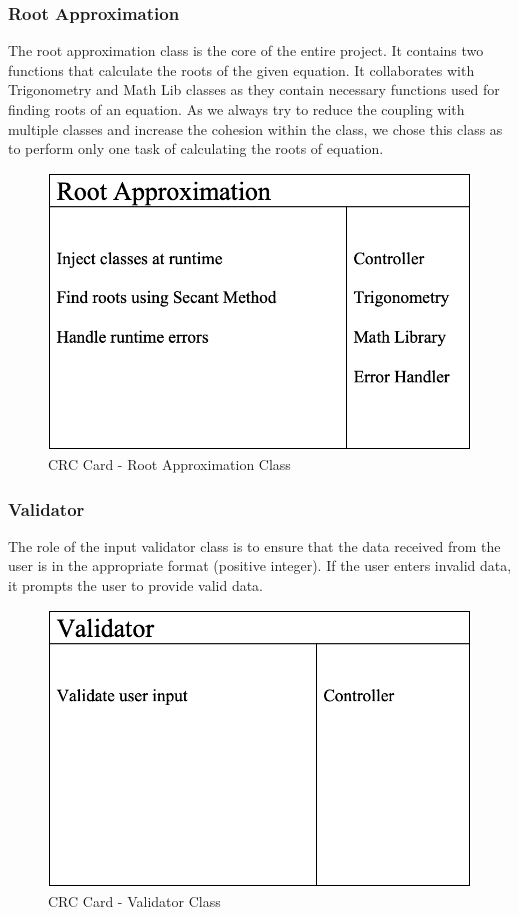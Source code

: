     \subsubsection{Root Approximation}
      \parbox{1.0\linewidth}{
        The root approximation class is the core of the entire project. It contains two functions that calculate the roots of the given equation. It collaborates with Trigonometry and Math Lib classes as they contain necessary functions used for finding roots of an equation. As we always try to reduce the coupling with multiple classes and increase the cohesion within the class, we chose this class as to perform only one task of calculating the roots of equation.
      }
      \vspace*{2em}
      \begin{figure}[h!]
        \centering
        \includegraphics[width=.5\linewidth]{resources/RootApproximation.png}
        \caption{CRC Card - Root Approximation Class}\label{fig:rootapprox}
      \end{figure} 

    \subsubsection{Validator}
      \parbox{1.0\linewidth}{
        The role of the input validator class is to ensure that the data received from the user is in the appropriate format (positive integer). If the user enters invalid data, it prompts the user to provide valid data.
      }
      \vspace*{2em}
      \begin{figure}[h!]
        \centering
        \includegraphics[width=.5\linewidth]{resources/Validator.png}
        \caption{CRC Card - Validator Class}\label{fig:validator}
      \end{figure}  

